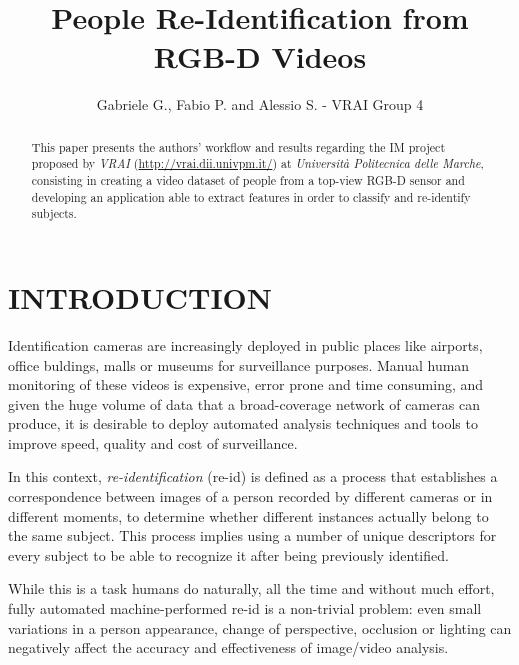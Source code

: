 \documentclass[letterpaper, 11pt, conference]{ieeeconf} %
\title{\LARGE \bf People Re-Identification from RGB-D Videos}
\author{Gabriele G., Fabio P. and Alessio S. - VRAI Group 4}
\begin{document}
\maketitle
\thispagestyle{empty}
\pagestyle{empty}

\begin{abstract}
This paper presents the authors' workflow and results regarding the IM project proposed by \emph{VRAI} (\url{http://vrai.dii.univpm.it/}) at \emph{Università Politecnica delle Marche}, consisting in creating a video dataset of people from a top-view RGB-D sensor and developing an application able to extract features in order to classify and re-identify subjects.
\end{abstract}

\section{INTRODUCTION}
Identification cameras are increasingly deployed in public places like airports, office buldings, malls or museums for surveillance purposes. Manual human monitoring of these videos is expensive, error prone and time consuming, and given the huge volume of data that a broad-coverage network of cameras can produce, it is desirable to deploy automated analysis techniques and tools to improve speed, quality and cost of surveillance\cite{c1}.

In this context, \emph{re-identification} (re-id) is defined as a process that establishes a correspondence between images of a person recorded by different cameras or in different moments, to determine whether different instances actually belong to the same subject. This process implies using a number of unique descriptors for every subject to be able to recognize it after being previously identified.

While this is a task humans do naturally, all the time and without much effort, fully automated machine-performed re-id is a non-trivial problem: even small variations in a person appearance, change of perspective, occlusion or lighting can negatively affect the accuracy and effectiveness of image\slash video analysis.
\end{document}
